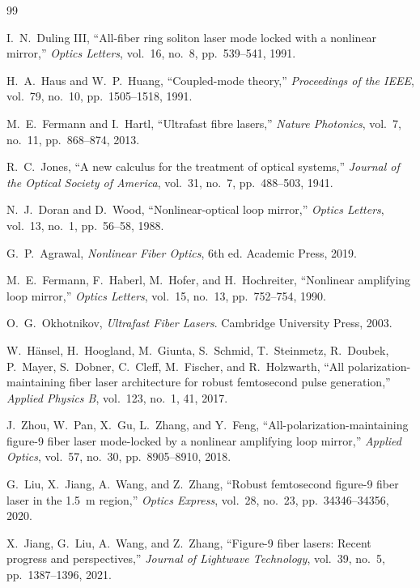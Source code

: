 \documentclass[11pt,a4paper]{ctexart}
\begin{document}
\begin{thebibliography}{99}

I.~N.~Duling III, ``All-fiber ring soliton laser mode locked with a nonlinear mirror,''
\textit{Optics Letters}, vol.~16, no.~8, pp.~539--541, 1991.

H.~A.~Haus and W.~P.~Huang, ``Coupled-mode theory,''
\textit{Proceedings of the IEEE}, vol.~79, no.~10, pp.~1505--1518, 1991.

M.~E.~Fermann and I.~Hartl, ``Ultrafast fibre lasers,''
\textit{Nature Photonics}, vol.~7, no.~11, pp.~868--874, 2013.

R.~C.~Jones, ``A new calculus for the treatment of optical systems,''
\textit{Journal of the Optical Society of America}, vol.~31, no.~7, pp.~488--503, 1941.

N.~J.~Doran and D.~Wood, ``Nonlinear-optical loop mirror,''
\textit{Optics Letters}, vol.~13, no.~1, pp.~56--58, 1988.

G.~P.~Agrawal, \textit{Nonlinear Fiber Optics}, 6th ed.
Academic Press, 2019.

M.~E.~Fermann, F.~Haberl, M.~Hofer, and H.~Hochreiter,
``Nonlinear amplifying loop mirror,''
\textit{Optics Letters}, vol.~15, no.~13, pp.~752--754, 1990.

O.~G.~Okhotnikov, \textit{Ultrafast Fiber Lasers}.
Cambridge University Press, 2003.

W.~H\"ansel, H.~Hoogland, M.~Giunta, S.~Schmid, T.~Steinmetz, R.~Doubek,
P.~Mayer, S.~Dobner, C.~Cleff, M.~Fischer, and R.~Holzwarth,
``All polarization-maintaining fiber laser architecture for robust femtosecond pulse generation,''
\textit{Applied Physics B}, vol.~123, no.~1, 41, 2017.

J.~Zhou, W.~Pan, X.~Gu, L.~Zhang, and Y.~Feng,
``All-polarization-maintaining figure-9 fiber laser mode-locked by a nonlinear amplifying loop mirror,''
\textit{Applied Optics}, vol.~57, no.~30, pp.~8905--8910, 2018.

G.~Liu, X.~Jiang, A.~Wang, and Z.~Zhang,
``Robust femtosecond figure-9 fiber laser in the 1.5~\textmu m region,''
\textit{Optics Express}, vol.~28, no.~23, pp.~34346--34356, 2020.

X.~Jiang, G.~Liu, A.~Wang, and Z.~Zhang,
``Figure-9 fiber lasers: Recent progress and perspectives,''
\textit{Journal of Lightwave Technology}, vol.~39, no.~5, pp.~1387--1396, 2021.

\end{thebibliography}
\end{document}
